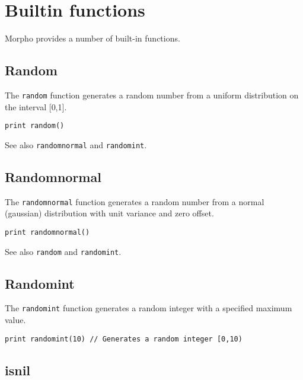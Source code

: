 \hypertarget{builtin-functions}{%
\section{Builtin functions}\label{builtin-functions}}

Morpho provides a number of built-in functions.

\hypertarget{random}{%
\subsection{Random}\label{random}}

The \texttt{random} function generates a random number from a uniform
distribution on the interval {[}0,1{]}.

\begin{lstlisting}
print random() 
\end{lstlisting}

See also \texttt{randomnormal} and \texttt{randomint}.

\hypertarget{randomnormal}{%
\subsection{Randomnormal}\label{randomnormal}}

The \texttt{randomnormal} function generates a random number from a
normal (gaussian) distribution with unit variance and zero offset.

\begin{lstlisting}
print randomnormal() 
\end{lstlisting}

See also \texttt{random} and \texttt{randomint}.

\hypertarget{randomint}{%
\subsection{Randomint}\label{randomint}}

The \texttt{randomint} function generates a random integer with a
specified maximum value.

\begin{lstlisting}
print randomint(10) // Generates a random integer [0,10)
\end{lstlisting}

\hypertarget{isnil}{%
\subsection{isnil}\label{isnil}}

